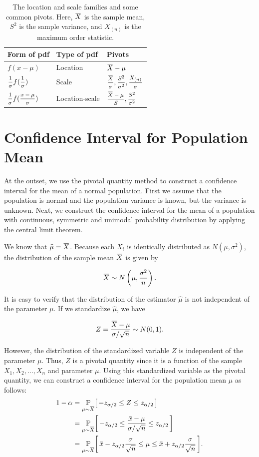 \begin{table}[h!]
\centering
\renewcommand{\arraystretch}{1.2}
\begin{tabularx}{0.45\paperwidth}{p{2.5cm} p{2.5cm} p{3cm}}
    \toprule
    Form of pdf & Type of pdf & Pivots \\[0.6em]
    \midrule
    $f(x - \mu)$ & Location & $\ols{X} - \mu$\\[0.6em]
    $\mfrac{1}{\sigma} f(\mfrac{1}{\sigma})$ & Scale & $\mfrac{\ols{X}}{\sigma}, \mfrac{S^2}{\sigma^2}, \mfrac{X_{(n)}}{\sigma}$\\[0.6em]
    $\mfrac{1}{\sigma} f(\mfrac{x - \mu}{\sigma})$ & Location-scale & $\mfrac{\ols{X} - \mu}{S}, \mfrac{S^2}{\sigma^2}$\\[0.6em]
    \bottomrule
\end{tabularx}
\caption{The location and scale families and some common pivots. Here, $\ols{X}$ is the sample mean, $S^2$ is the sample variance, and $X_{(n)}$ is the maximum order statistic.}
\end{table}

\section{Confidence Interval for Population Mean}

At the outset, we use the pivotal quantity method to construct a confidence interval for the mean of a normal population. 
First we assume that the population is normal and the population variance is known, but the variance is unknown. Next, we
 construct the confidence interval for the mean of a population with continuous,
 symmetric and unimodal probability distribution by applying the central
 limit theorem.

We know that $\widehat{\mu} = \ols{X}$. Because each $X_i$ is identically distributed as $N(\mu, \sigma^2)$,
the distribution of the sample mean $\ols{X}$ is given by

\[
\ols{X} \sim N\left(\mu, \frac{\sigma^2}{n}\right).
\]

It is easy to verify that the distribution of the estimator $\widehat{\mu}$ is not independent of the parameter $\mu$. 
If we standardize $\widehat{\mu}$, we have

\[
Z = \frac{\ols{X} - \mu}{\sigma / \sqrt{n}} \sim N(0, 1).
\]

However, the distribution of the standardized variable $Z$ is independent of the parameter $\mu$. Thus, $Z$ is a pivotal quantity
since it is a function of the sample $X_1, X_2, \ldots, X_n$ and parameter $\mu$. Using this 
standardized variable as the pivotal quantity, we can construct a confidence interval for the population mean $\mu$
as follows:
\begin{align*}
    1 - \alpha &= \uprob[\mu \sim \ols{X}]{-z_{\alpha / 2} \leq Z \leq z_{\alpha/2} }\\
    &= \uprob[\mu \sim \ols{X}]{ -z_{\alpha / 2} \leq \frac{\ols{x} - \mu}{\sigma / \sqrt{n}} \leq z_{\alpha/2} }\\
    &= \uprob[\mu \sim \ols{X}]{ \ols{x} - z_{\alpha / 2} \frac{\sigma}{\sqrt{n}} \leq \mu \leq \ols{x} + z_{\alpha/2} \frac{\sigma}{\sqrt{n}} }.
\end{align*}

